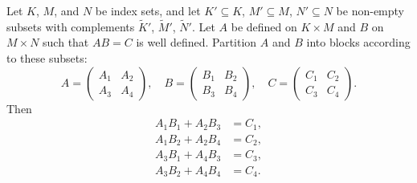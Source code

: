Let $K$, $M$, and $N$ be index sets, and let $K' \subseteq K$, $M' \subseteq M$, $N' \subseteq N$ be non-empty subsets with complements $\tilde{K}'$, $\tilde{M}'$, $\tilde{N}'$. Let $A$ be defined on $K \times M$ and $B$ on $M \times N$ such that $AB = C$ is well defined. Partition $A$ and $B$ into blocks according to these subsets:
$$A = \begin{pmatrix} A_1 & A_2 \\ A_3 & A_4 \end{pmatrix}, \quad B = \begin{pmatrix} B_1 & B_2 \\ B_3 & B_4 \end{pmatrix}, \quad C = \begin{pmatrix} C_1 & C_2 \\ C_3 & C_4 \end{pmatrix}.$$
Then
\begin{align*}
A_1 B_1 + A_2 B_3 &= C_1, \\
A_1 B_2 + A_2 B_4 &= C_2, \\
A_3 B_1 + A_4 B_3 &= C_3, \\
A_3 B_2 + A_4 B_4 &= C_4.
\end{align*}

